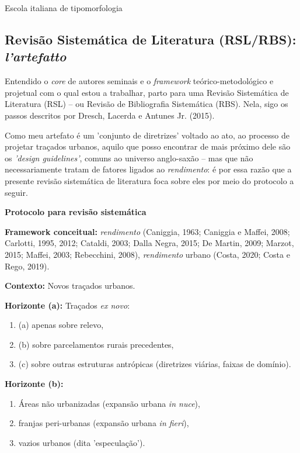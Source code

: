 \documentclass[]{report}
\begin{document}
				Escola italiana de tipomorfologia

				\subsection{Revisão Sistemática de Literatura (RSL/RBS): \textit{l'artefatto}}
				Entendido o \textit{core} de autores seminais e o \textit{framework} teórico-metodológico e projetual com o qual estou a trabalhar, parto para uma Revisão Sistemática de Literatura (RSL) – ou Revisão de Bibliografia Sistemática (RBS). Nela, sigo os passos descritos por Dresch, Lacerda e Antunes Jr. (2015).

				Como meu artefato é um 'conjunto de diretrizes' voltado ao ato, ao processo de projetar traçados urbanos, aquilo que posso encontrar de mais próximo dele são os \textit{'design guidelines'}, comuns ao universo anglo-saxão – mas que não necessariamente tratam de fatores ligados ao \textit{rendimento}: é por essa razão que a presente revisão sistemática de literatura foca sobre eles por meio do protocolo a seguir.

					\textbf{Protocolo para revisão sistemática}

					\textbf{Framework conceitual:} \textit{rendimento} (Caniggia, 1963; Caniggia e Maffei, 2008; Carlotti, 1995, 2012; Cataldi, 2003; Dalla Negra, 2015; De Martin, 2009; Marzot, 2015; Maffei, 2003; Rebecchini, 2008), \textit{rendimento} urbano (Costa, 2020; Costa e Rego, 2019).

					\textbf{Contexto:} Novos traçados urbanos.

					\textbf{Horizonte (a):} Traçados \textit{ex novo}: 
					\begin{enumerate}
						\item (a) apenas sobre relevo, 
						\item (b) sobre parcelamentos rurais precedentes, \item (c) sobre outras estruturas antrópicas (diretrizes viárias, faixas de domínio).
					\end{enumerate}

					\textbf{Horizonte (b):} 
					\begin{enumerate}
						\item Áreas não urbanizadas (expansão urbana \textit{in nuce}), 
						\item franjas peri-urbanas (expansão urbana \textit{in fieri}), 
						\item vazios urbanos (dita 'especulação').
					\end{enumerate}
\end{document}
